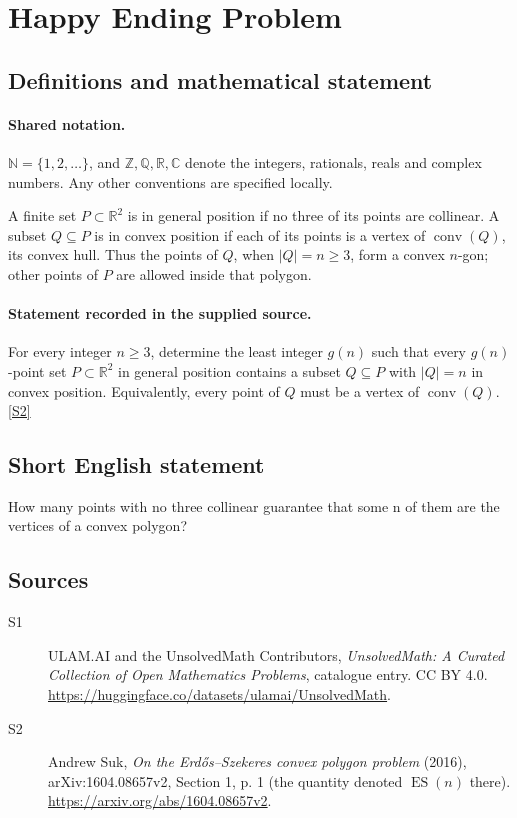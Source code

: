 \documentclass[11pt]{article}
\newcommand{\sref}[2]{\hyperlink{source:#1:#2}{[S#2]}}
\begin{document}
\section{Happy Ending Problem}\label{statement}

\subsection{Definitions and mathematical statement}

\paragraph{Shared notation.}$\mathbb N=\{1,2,\ldots\}$, and $\mathbb Z,\mathbb Q,\mathbb R,\mathbb C$ denote the integers, rationals, reals and complex numbers. Any other conventions are specified locally.


A finite set $P\subset\mathbb R^2$ is in general position if no three of its points are collinear. A subset $Q\subseteq P$ is in convex position if each of its points is a vertex of $\operatorname{conv}(Q)$, its convex hull. Thus the points of $Q$, when $|Q|=n\ge3$, form a convex $n$-gon; other points of $P$ are allowed inside that polygon.
\paragraph{Statement recorded in the supplied source.}
For every integer $n\ge3$, determine the least integer $g(n)$ such that every $g(n)$-point set $P\subset\mathbb R^2$ in general position contains a subset $Q\subseteq P$ with $|Q|=n$ in convex position. Equivalently, every point of $Q$ must be a vertex of $\operatorname{conv}(Q)$. \sref{statement}{2}
\subsection{Short English statement}
How many points with no three collinear guarantee that some n of them are the vertices of a convex polygon?
\subsection{Sources}
\begin{description}
\item[\hypertarget{source:statement:1}{S1}] ULAM.AI and the UnsolvedMath Contributors, \emph{UnsolvedMath: A Curated Collection of Open Mathematics Problems}, catalogue entry. CC BY 4.0. \url{https://huggingface.co/datasets/ulamai/UnsolvedMath}.
\item[\hypertarget{source:statement:2}{S2}] Andrew Suk, \emph{On the Erdős--Szekeres convex polygon problem} (2016), arXiv:1604.08657v2, Section 1, p. 1 (the quantity denoted $\operatorname{ES}(n)$ there). \url{https://arxiv.org/abs/1604.08657v2}.
\end{description}
\label{end:statement}
\end{document}
